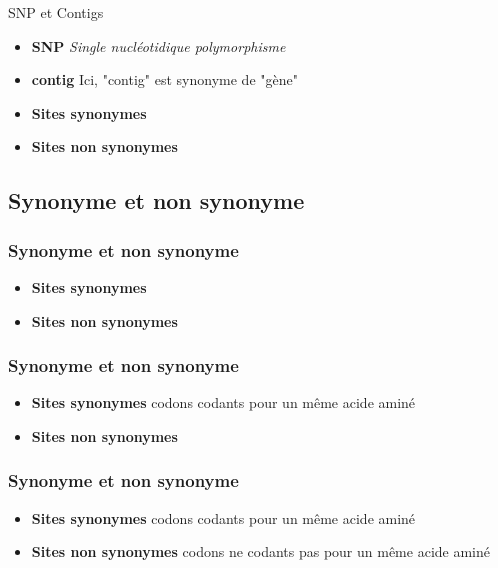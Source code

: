 \begin{frame}{SNP et Contigs}

    \begin{itemize}
        \item  \textbf{SNP} \textit{Single nucléotidique polymorphisme}

        \item  \textbf{contig} Ici, "contig" est synonyme de "gène"
    \end{itemize}
 

    \begin{itemize}
        \item \textbf{Sites synonymes}
        \item \textbf{Sites non synonymes}
    \end{itemize}
\end{frame}

\subsection{Synonyme et non synonyme}
\begin{frame}
    \frametitle{Synonyme et non synonyme}
    

    \small
    \begin{itemize}
        \item \textbf{Sites synonymes}
        \item \textbf{Sites non synonymes}
    \end{itemize}

\end{frame}





\begin{frame}
    \frametitle{Synonyme et non synonyme}
    
    \small

    \begin{itemize}
        \item \textbf{Sites synonymes} codons codants pour un même acide aminé
        \item \textbf{Sites non synonymes} 
    \end{itemize}


\end{frame}


\begin{frame}
    \frametitle{Synonyme et non synonyme}
    
    \small
    \begin{itemize}
        \item \textbf{Sites synonymes} codons codants pour un même acide aminé
        \item \textbf{Sites non synonymes} codons ne codants pas pour un même acide aminé
    \end{itemize}

\end{frame}

